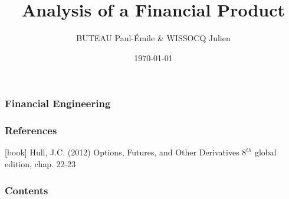 \documentclass[t]{beamer}
\title{Analysis of a Financial Product}
\author{BUTEAU Paul-\'Emile \& WISSOCQ Julien }
\date{\today}
\begin{document}

\begin{frame}[c]
\frametitle{Financial Engineering}
\titlepage
\end{frame}

\begin{frame}[c]
\frametitle{References}
\footnotesize{
\begin{thebibliography}{9}


[book]
 Hull, J.C. (2012)
	\newblock Options, Futures, and Other Derivatives
	\newblock $8^{th}$ global edition, chap. 22-23

\end{thebibliography}
}
\end{frame}

\begin{frame}[c]
\frametitle{Contents}
\tableofcontents
\end{frame}



%
%
\end{document}
